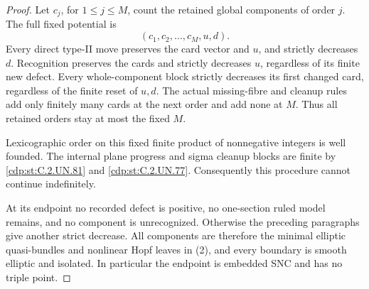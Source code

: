 \begin{proof}
Let \(c_j\), for \(1\le j\le M\), count
the retained global components of order \(j\).
The full fixed potential is
\[
                 (c_1,c_2,\ldots,c_M,u,d).
 \tag{C.GP.10}\label{cdp:eq:C.GP.10}
\]
Every direct type-II move preserves the card
vector and \(u\), and strictly decreases \(d\).
Recognition preserves the cards and strictly
decreases \(u\), regardless of its finite
new defect. Every whole-component block
strictly decreases its first changed card,
regardless of the finite reset of \(u,d\).
The actual missing-fibre and cleanup rules
add only finitely many cards at the next
order and add none at \(M\). Thus all
retained orders stay at most the fixed \(M\).

Lexicographic order on this fixed finite
product of nonnegative integers is well
founded. The internal plane progress and
sigma cleanup blocks are finite by \ref{cdp:st:C.2.UN.81}
and \ref{cdp:st:C.2.UN.77}. Consequently this procedure
cannot continue indefinitely.

At its endpoint no recorded defect is
positive, no one-section ruled model
remains, and no component is unrecognized.
Otherwise the preceding paragraphs give
another strict decrease. All components
are therefore the minimal elliptic
quasi-bundles and nonlinear Hopf leaves
in (2), and every boundary is smooth
elliptic and isolated. In particular the
endpoint is embedded SNC and has no
triple point.


\end{proof}
